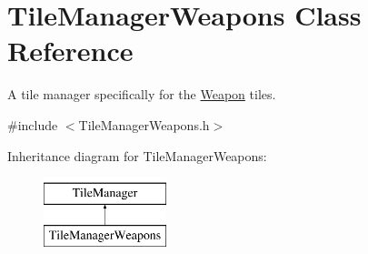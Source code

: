 \hypertarget{class_tile_manager_weapons}{}\section{Tile\+Manager\+Weapons Class Reference}
\label{class_tile_manager_weapons}


A tile manager specifically for the \mbox{\hyperlink{class_weapon}{Weapon}} tiles.  




{\ttfamily \#include $<$Tile\+Manager\+Weapons.\+h$>$}

Inheritance diagram for Tile\+Manager\+Weapons\+:\begin{figure}[H]
\begin{center}
\leavevmode
\includegraphics[height=2.000000cm]{class_tile_manager_weapons}
\end{center}
\end{figure}

